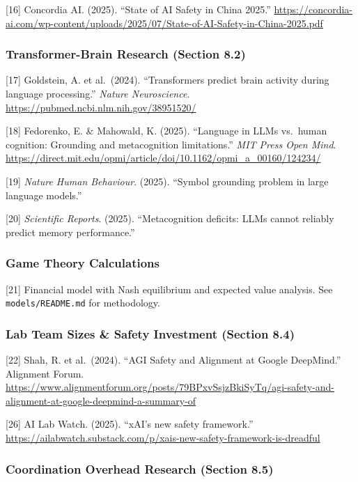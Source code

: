 \documentclass[
  11pt,
]{article}
\begin{document}
{[}16{]} Concordia AI. (2025). ``State of AI Safety in China 2025.''
\url{https://concordia-ai.com/wp-content/uploads/2025/07/State-of-AI-Safety-in-China-2025.pdf}

\subsubsection{Transformer-Brain Research (Section
8.2)}\label{transformer-brain-research-section-8.2}

{[}17{]} Goldstein, A. et al.~(2024). ``Transformers predict brain
activity during language processing.'' \emph{Nature Neuroscience}.
\url{https://pubmed.ncbi.nlm.nih.gov/38951520/}

{[}18{]} Fedorenko, E. \& Mahowald, K. (2025). ``Language in LLMs
vs.~human cognition: Grounding and metacognition limitations.''
\emph{MIT Press Open Mind}.
\url{https://direct.mit.edu/opmi/article/doi/10.1162/opmi_a_00160/124234/}

{[}19{]} \emph{Nature Human Behaviour}. (2025). ``Symbol grounding
problem in large language models.''

{[}20{]} \emph{Scientific Reports}. (2025). ``Metacognition deficits:
LLMs cannot reliably predict memory performance.''

\subsubsection{Game Theory Calculations}\label{game-theory-calculations}

{[}21{]} Financial model with Nash equilibrium and expected value
analysis. See \texttt{models/README.md} for methodology.

\subsubsection{Lab Team Sizes \& Safety Investment (Section
8.4)}\label{lab-team-sizes-safety-investment-section-8.4}

{[}22{]} Shah, R. et al.~(2024). ``AGI Safety and Alignment at Google
DeepMind.'' Alignment Forum.
\url{https://www.alignmentforum.org/posts/79BPxvSsjzBkiSyTq/agi-safety-and-alignment-at-google-deepmind-a-summary-of}

{[}26{]} AI Lab Watch. (2025). ``xAI's new safety framework.''
\url{https://ailabwatch.substack.com/p/xais-new-safety-framework-is-dreadful}

\subsubsection{Coordination Overhead Research (Section
8.5)}\label{coordination-overhead-research-section-8.5}
\end{document}
